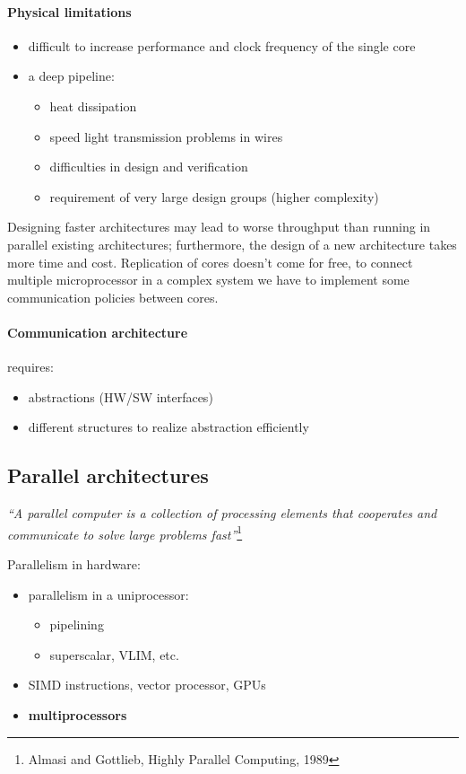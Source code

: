 \paragraph{Physical limitations}
\begin{itemize}
    \item difficult to increase performance and clock frequency of the single core
    \item a deep pipeline:
    \begin{itemize}
        \item heat dissipation
        \item speed light transmission problems in wires
        \item difficulties in design and verification
        \item requirement of very large design groups (higher complexity)
    \end{itemize}
\end{itemize}

Designing faster architectures may lead to worse throughput than running in parallel existing architectures;
furthermore, the design of a new architecture takes more time and cost.
Replication of cores doesn't come for free, to connect multiple microprocessor in a complex system we have to implement
some communication policies between cores.

\paragraph{Communication architecture} requires:
\begin{itemize}
    \item abstractions (HW/SW interfaces)
    \item different structures to realize abstraction efficiently
\end{itemize}

\subsection{Parallel architectures}\label{subsec:parallel-architecture}
\textit{“A parallel computer is a collection of
processing elements that cooperates and
communicate to solve large problems fast”}\footnote{Almasi and Gottlieb, Highly Parallel Computing, 1989}

Parallelism in hardware:
\begin{itemize}
    \item parallelism in a uniprocessor:
    \begin{itemize}
        \item pipelining
        \item superscalar, VLIM, etc.
    \end{itemize}
    \item SIMD instructions, vector processor, GPUs
    \item \textbf{multiprocessors}
\end{itemize}

